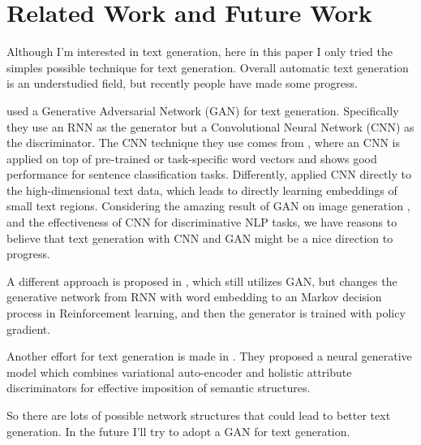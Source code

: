 \documentclass[a4paper]{article}
\begin{document}
\section{Related Work and Future Work}
Although I'm interested in text generation, here in this paper I only tried the simples possible technique for text generation. Overall automatic text generation is an understudied field, but recently people have made some progress.

\cite{textGAN} used a Generative Adversarial Network (GAN) for text generation. Specifically they use an RNN as the generator but a Convolutional Neural Network (CNN) as the discriminator. The CNN technique they use comes from \cite{kim2014convolutional}, where an CNN is applied on top of pre-trained or task-specific word vectors and shows good performance for sentence classification tasks. Differently, \cite{johnson2014effective} applied CNN directly to the high-dimensional text data, which leads to directly learning embeddings of small text regions. Considering the amazing result of GAN on image generation \citep{goodfellow2014generative}, and the effectiveness of CNN for discriminative NLP tasks, we have reasons to believe that text generation with CNN and GAN might be a nice direction to progress.

A different approach is proposed in \cite{yu2016sequence}, which still utilizes GAN, but changes the generative network from RNN with word embedding to an Markov decision process in Reinforcement learning, and then the generator is trained with policy gradient. 

Another effort for text generation is made in \cite{hu2017controllable}. They proposed a neural generative model which combines variational auto-encoder \citep{kingma2013auto} and holistic attribute discriminators for effective imposition of semantic structures. 

So there are lots of possible network structures that could lead to better text generation. In the future I'll try to adopt a GAN for text generation.



\end{document}
